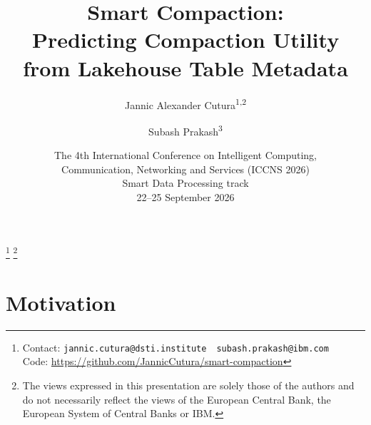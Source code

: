 \documentclass[aspectratio=169, 10pt]{beamer}
\title[Compaction Utility Prediction]{Smart Compaction:\\Predicting Compaction Utility from Lakehouse Table Metadata}
\author[Cutura \& Prakash]{%
  Jannic Alexander Cutura\textsuperscript{1,2} \and Subash Prakash\textsuperscript{3}}
\institute[ECB / DSTI / IBM]{%
  \textsuperscript{1}European Central Bank \quad
  \textsuperscript{2}DSTI School of Engineering \quad
  \textsuperscript{3}IBM}
\date[ICCNS 2026]{%
  {\footnotesize The 4th International Conference on Intelligent Computing,\\
  Communication, Networking and Services (ICCNS 2026)}\\[0.2em]
  {\footnotesize Smart Data Processing track}\\[0.4em]
  {\small 22--25 September 2026}}
\begin{document}
\begin{frame}
\titlepage
{\let\thefootnote\relax
\footnote{\scriptsize Contact: \texttt{jannic.cutura@dsti.institute}
\,\textbar\, \texttt{subash.prakash@ibm.com}\\
\hspace*{0pt}Code: \url{https://github.com/JannicCutura/smart-compaction}}%
\footnote{\scriptsize The views expressed in this
presentation are solely those of the authors and do not necessarily reflect
the views of the European Central Bank, the European System of Central Banks
or IBM.}}
\end{frame}

\section{Motivation}
\end{document}
